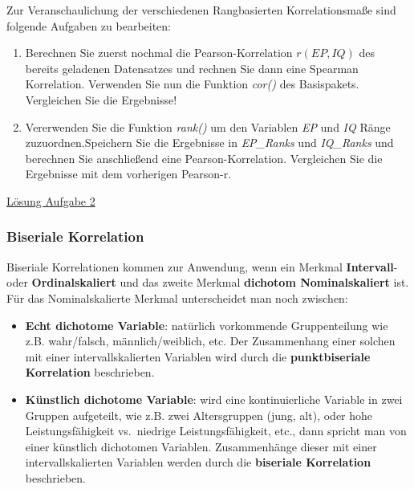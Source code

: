 \documentclass[]{article}
\providecommand{\tightlist}{%
  \setlength{\itemsep}{0pt}\setlength{\parskip}{0pt}}
\begin{document}
Zur Veranschaulichung der verschiedenen Rangbasierten Korrelationsmaße sind folgende Aufgaben zu bearbeiten:

\begin{enumerate}
\def\labelenumi{\arabic{enumi}.}
\tightlist
\item
  Berechnen Sie zuerst nochmal die Pearson-Korrelation \(r(EP,IQ)\) des bereits geladenen Datensatzes
  und rechnen Sie dann eine Spearman Korrelation. Verwenden Sie nun die Funktion \emph{cor()} des Basispakets.
  Vergleichen Sie die Ergebnisse!
\item
  Vererwenden Sie die Funktion \emph{rank()} um den Variablen \emph{EP} und \emph{IQ} Ränge zuzuordnen.Speichern Sie die Ergebnisse in \emph{EP\_Ranks} und \emph{IQ\_Ranks} und berechnen Sie anschließend eine Pearson-Korrelation. Vergleichen Sie die Ergebnisse mit dem vorherigen Pearson-r.
\end{enumerate}

\protect\hyperlink{aufgabe_2}{Lösung Aufgabe 2}

\hypertarget{biseriale-korrelation}{%
\subsubsection*{Biseriale Korrelation}\label{biseriale-korrelation}}

Biseriale Korrelationen kommen zur Anwendung, wenn ein Merkmal \textbf{Intervall}- oder \textbf{Ordinalskaliert} und das zweite Merkmal \textbf{dichotom Nominalskaliert} ist. Für das Nominalskalierte Merkmal unterscheidet man noch zwischen:

\begin{itemize}
\tightlist
\item
  \textbf{Echt dichotome Variable}: natürlich vorkommende Gruppenteilung wie z.B. wahr/falsch, männlich/weiblich, etc. Der Zusammenhang einer solchen mit einer intervallskalierten Variablen wird durch die \textbf{punktbiseriale Korrelation} beschrieben.
\item
  \textbf{Künstlich dichotome Variable}: wird eine kontinuierliche Variable in zwei Gruppen aufgeteilt, wie z.B. zwei Altersgruppen (jung, alt), oder hohe Leistungsfähigkeit vs.~niedrige Leistungsfähigkeit, etc., dann spricht man von einer künstlich dichotomen Variablen. Zusammenhänge dieser mit einer intervallskalierten Variablen werden durch die \textbf{biseriale Korrelation} beschrieben.
\end{itemize}
\end{document}

